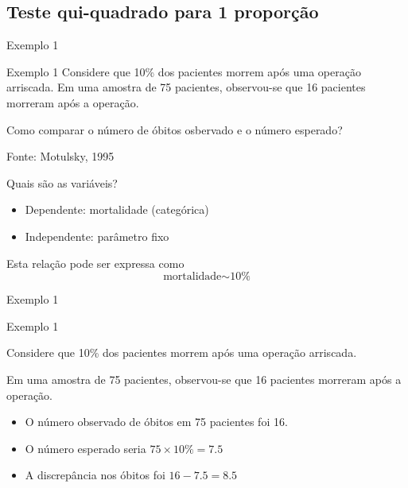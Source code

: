 \documentclass{beamer}
\begin{document}
\subsection{Teste qui-quadrado para 1 proporção}

\begin{frame}{\scriptsize Exemplo 1}
  \begin{exampleblock}{Exemplo 1}
    \footnotesize
    Considere que 10\% dos pacientes morrem após uma operação
    arriscada. Em uma amostra de 75 pacientes, observou-se que 16
    pacientes morreram após a operação.

    \bigskip
    Como comparar o número de óbitos osbervado e o número esperado?

    \bigskip
    {\hfill \tiny Fonte: Motulsky, 1995}
  \end{exampleblock}
\end{frame}

\begin{frame}{\scriptsize Quais são as variáveis?}
  \begin{itemize}
    \footnotesize
  \item Dependente: mortalidade (categórica)
  \item Independente: parâmetro fixo
  \end{itemize}
  \vfill
  \begin{block}{Esta relação pode ser expressa como}
    \begin{displaymath}
      \text{mortalidade} \sim \text{10\%}
    \end{displaymath}
  \end{block}
\end{frame}

\begin{frame}{Exemplo 1}
  \begin{exampleblock}{Exemplo 1}
    \footnotesize

    Considere que 10\% dos pacientes morrem após uma operação
    arriscada.

    Em uma amostra de 75 pacientes, observou-se que 16 pacientes
    morreram após a operação.
  \end{exampleblock}
  \begin{itemize}
    \small
  \item O número observado de óbitos em 75 pacientes foi 16.
  \item O número esperado seria $75 \times 10\% = 7.5$
  \item A discrepância nos óbitos foi $16-7.5 = 8.5$
  \end{itemize}
\end{frame}
\end{document}
